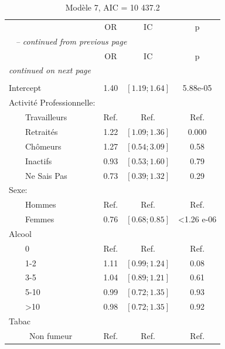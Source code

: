 \documentclass{book}
\begin{document}
\begin{longtable}{lccc}\caption{Modèle 7, AIC  = 10 437.2}\\
    \hline  
		& \multirow{2}{*}{OR} & \multirow{2}{*}{IC}& \multirow{2}{*}{p}\\ 
		 &    				    &    			    &                  \\ 
   \hline
    \hline     
    \endfirsthead 
    \multicolumn{4}{l}{\tablename\ \thetable{} \textit{-- continued from previous page}}\\ 
    \hline
		& \multirow{2}{*}{OR} & \multirow{2}{*}{IC}& \multirow{2}{*}{p}\\ 
		&    				    &    			    &                  \\ 
    \hline
    \hline  
    \endhead   
    \hline
    \multicolumn{4}{l}{\textit{continued on next page}} \\ 
    \endfoot   
    \multicolumn{4}{l}{}  \\ 
    \endlastfoot  
Intercept & 1.40 & $\left[1.19 ; 1.64 \right]$ & 5.88e-05\\
Activité Professionnelle: &              &              &	\\ 
$\qquad$Travailleurs 		&		Ref.		& 	Ref.		&	Ref.\\ 
$\qquad$Retraités&1.22 &$\left[1.09 ; 1.36 \right]$ & 0.000\\ 
$\qquad$Chômeurs & 1.27& $\left[0.54 ; 3.09\right]$& 0.58\\ 
$\qquad$Inactifs  & 0.93& $\left[0.53 ; 1.60\right]$& 0.79\\ 
$\qquad$Ne Sais Pas & 0.73& $\left[0.39 ; 1.32\right]$ & 0.29 \\ 
Sexe: &              &              &                          \\ 
$\qquad$Hommes &Ref. & Ref.& Ref.\\ 
$\qquad$Femmes & 0.76& $\left[0.68 ; 0.85 \right]$ & <1.26 e-06\\
Alcool&&&\\
$\qquad$0 & Ref. & Ref. & Ref.\\
$\qquad$1-2 &1.11 & $\left[0.99 ; 1.24 \right]$ & 0.08\\
$\qquad$3-5 & 1.04 & $\left[0.89 ; 1.21 \right]$ & 0.61\\
$\qquad$5-10 & 0.99 & $\left[0.72 ; 1.35 \right]$ &0.93\\
$\qquad$>10 & 0.98 & $\left[0.72 ; 1.35 \right]$ & 0.92\\
Tabac&&&\\\
$\qquad$Non fumeur& Ref.& Ref.&Ref.\\

\end{longtable}
\end{document}
